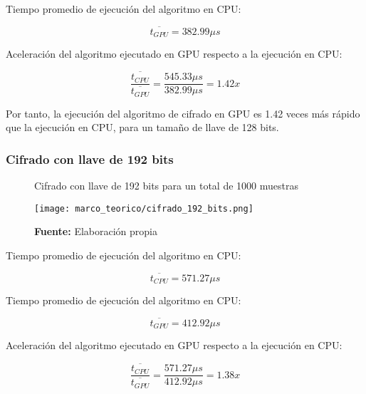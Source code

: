 \documentclass[../main/main.tex]{subfiles}
\begin{document}
        Tiempo promedio de ejecución del algoritmo en CPU:

        \vspace{-0.7cm}\begin{equation}
          \overline{t_{GPU}} = 382.99\mu s
        \end{equation}

        Aceleración del algoritmo ejecutado en GPU respecto a la ejecución en CPU:

        \vspace{-0.7cm}\begin{equation}
          \frac{\overline{t_{CPU}}}{\overline{t_{GPU}}} = \frac{545.33\mu s}{382.99\mu s} = 1.42x
        \end{equation}

        Por tanto, la ejecución del algoritmo de cifrado en GPU es 1.42 veces más rápido que la ejecución en CPU, para un tamaño de llave de 128 bits.

      \subsubsection{Cifrado con llave de 192 bits}

        \begin{figure}[H]
          \centering
          \caption{Cifrado con llave de 192 bits para un total de 1000 muestras}
          \texttt{[image: marco\_teorico/cifrado\_192\_bits.png]}
          \caption*{\textbf{Fuente:} Elaboración propia}
        \end{figure}

        Tiempo promedio de ejecución del algoritmo en CPU:

        \vspace{-0.7cm}\begin{equation}
          \overline{t_{CPU}} = 571.27\mu s
        \end{equation}

        Tiempo promedio de ejecución del algoritmo en CPU:

        \vspace{-0.7cm}\begin{equation}
          \overline{t_{GPU}} = 412.92\mu s
        \end{equation}

        Aceleración del algoritmo ejecutado en GPU respecto a la ejecución en CPU:

        \vspace{-0.7cm}\begin{equation}
          \frac{\overline{t_{CPU}}}{\overline{t_{GPU}}} = \frac{571.27\mu s}{412.92\mu s} = 1.38x
        \end{equation}
\end{document}
